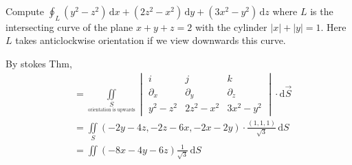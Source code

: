 \begin{example}
    Compute $\oint_L(y^2-z^2)\,\mathrm{d}x+(2z^2-x^2)\,\mathrm{d}y+(3x^2-y^2)\,\mathrm{d}z$ where $L$ is the intersecting curve of the plane $x+y+z=2$ with the cylinder $|x|+|y|=1$. Here $L$ takes anticlockwise orientation if we view downwards this curve.

    By stokes Thm,
    \begin{align*}
         & =\iint\limits_{\underset{\text{orientation is upwards}}{S}}\begin{vmatrix}
                                                                          i          & j          & k          \\
                                                                          \partial_x & \partial_y & \partial_z \\
                                                                          y^2-z^2    & 2z^2-x^2   & 3x^2-y^2
                                                                      \end{vmatrix}\cdot\mathrm{d}\overrightarrow{S} \\
         & =\iint\limits_S(-2y-4z,-2z-6x,-2x-2y)\cdot\frac{(1,1,1)}{\sqrt{3}}\,\mathrm{d}S                           \\
         & =\iint(-8x-4y-6z)\frac{1}{\sqrt{3}}\,\mathrm{d}S
    \end{align*}
\end{example}